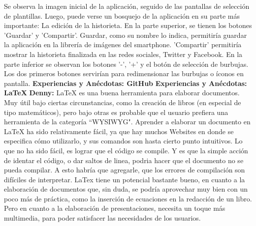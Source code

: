 \documentclass[12pt]{report}
\begin{document}
Se observa la imagen inicial de la aplicación, seguido de las pantallas de selección de plantillas. Luego, puede verse un bosquejo de la aplicación en su parte más importante: La edición de la historieta.
 \newline
 \newline
En la parte superior, se tienen los botones 'Guardar' y 'Compartir'. Guardar, como su nombre lo indica, permitiría guardar la aplicación en la librería de imágenes del smartphone. 'Compartir' permitiría mostrar la historieta finalizada en las redes sociales, Twitter y Facebook.
 \newline
 \newline
En la parte inferior se observan los botones '-', '+' y el botón de selección de burbujas. Los dos primeros botones servirían para redimensionar las burbujas o íconos en pantalla.
           \newline
           \newline
	\begingroup
		\large{
			\textbf{
			           \newline
			           \newline
				Experiencias y Anécdotas: GitHub
				\newline
				\newline
			}
		}
	\endgroup
	\newline
	\newline	
	\begingroup
		\large{
			\textbf{
				Experiencias y Anécdotas: LaTeX
				\newline
				\newline
			}
		}
	\endgroup
	\textbf{Denny:\newline\newline} LaTeX es una buena herramienta para elaborar documentos. Muy útil bajo ciertas circunstancias, como la creación de libros (en especial de tipo matemáticos), pero bajo otras es probable que el usuario prefiera una herramienta de la categoría ``WYSIWYG".
\newline
\newline
Aprender a elaborar un documento en LaTeX ha sido relativamente fácil, ya que hay muchos Websites en donde se especifica cómo utilizarlo, y sus comandos son hasta cierto punto intuitivos. Lo que no ha sido fácil, es lograr que el código se compile. Y es que la simple acción de identar el código, o dar saltos de linea,  podria hacer que el documento no se pueda compilar. A esto habría que agregarle, que los errores de compilación son difíciles de interpretar. 
\newline
\newline
LaTex tiene un potencial bastante bueno, en cuanto a la elaboración de documentos que, sin duda, se podría aprovechar muy bien con un poco más de práctica, como la inserción de ecuaciones en la redacción de un libro. Pero en cuanto a la elaboración de presentaciones, necesita un toque más multimedia, para poder satisfacer las necesidades de los usuarios.
\newline
\newline
\end{document}
